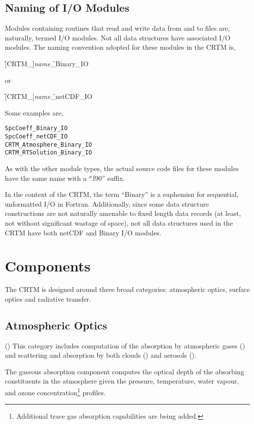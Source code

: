 \subsection{Naming of I/O Modules}
Modules containing routines that read and write data from and to files are, naturally, termed I/O modules. Not all data structures have associated I/O modules. The naming convention adopted for these modules in the CRTM is, 

\hspace{0.5cm}\f{[CRTM\_]}\textit{name}\f{\_Binary\_IO}

or

\hspace{0.5cm}\f{[CRTM\_]}\textit{name}\f{\_netCDF\_IO}

Some examples are,
\begin{alltt}
  SpcCoeff_Binary_IO
  SpcCoeff_netCDF_IO
  CRTM_Atmosphere_Binary_IO
  CRTM_RTSolution_Binary_IO\end{alltt}
As with the other module types, the actual source code files for these modules have the same name with a ``\f{.f90}'' suffix.

In the context of the CRTM, the term ``Binary'' is a euphemisn for sequential, unformatted I/O in Fortran. Additionally, since some data structure constructions are not naturally amenable to fixed length data records (at least, not without significant wastage of space), not all data structures used in the CRTM have both netCDF and Binary I/O modules.


\section{Components}
The CRTM is designed around three broad categories: atmospheric optics, surface optics and radiative transfer.

\subsection{Atmospheric Optics}
(\AtmOptics) This category includes computation of the absorption by atmospheric gases (\AtmAbsorption) and scattering and absorption by both clouds (\CloudScatter) and aerosols (\AerosolScatter).

The gaseous absorption component computes the optical depth of the absorbing constituents in the atmosphere given the pressure, temperature, water vapour, and ozone concentration\footnote{Additional trace gas absorption capabilities are being added.} profiles.

